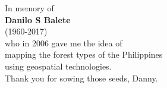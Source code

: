 
\begin{center}

In memory of\\
\textbf{Danilo S Balete}\\
(1960-2017)\\
who in 2006 gave me the idea of\\
mapping the forest types of the Philippines\\
using geospatial technologies.\\
Thank you for sowing those seeds, Danny.  

\end{center}
